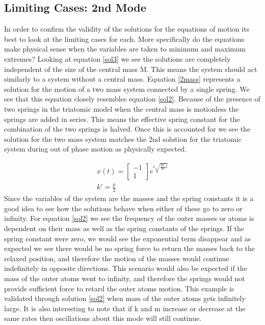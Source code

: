 \documentclass[hidelinks]{article}
\begin{document}
\begin{multicols}{2}
\section{Limiting Cases: 2nd Mode}
In order to confirm the validity of the solutions for the equations of motion its best to look at the limiting cases for each. More specifically do the equations make physical sense when the variables are taken to minimum and maximum extremes? Looking at equation \ref{sol3} we see the solutions are completely independent of the size of the central mass M. This means the system should act similarly to a system without a central mass. Equation \ref{2mass} represents a solution for the motion of a two mass system connected by a single spring. We see that this equation closely resembles equation \ref{sol2}. Because of the presence of two springs in the triatomic model when the central mass is motionless the springs are added in series. This means the effective spring constant for the combination of the two springs is halved. Once this is accounted for we see the solution for the two mass system matches the 2nd solution for the triatomic system during out of phase motion as physically expected.

\begin{equation}
\label{2mass}
\begin{split}
x(t)=
\begin{bmatrix}
-1\\
1
\end{bmatrix}
e^{i\sqrt{\frac{2k'}{m}t}}
\\
k'=\frac{k}{2}
\end{split}
\end{equation}
Since the variables of the system are the masses and the spring constants it is a good idea to see how the solutions behave when either of these go to zero or infinity. For equation \ref{sol2} we see the frequency of the outer masses or atoms is dependent on their mass as well as the spring constants of the springs. If the spring constant were zero, we would see the exponential term disappear and as expected we see there would be no spring force to return the masses back to the relaxed position, and therefore the motion of the masses would continue indefinitely in opposite directions. This scenario would also be expected if the mass of the outer atoms went to infinity, and therefore the springs would not provide sufficient force to retard the outer atoms motion. This example is validated through solution \ref{sol2} when mass of the outer atoms gets infinitely large. It is also interesting to note that if k and m increase or decrease at the same rates then oscillations about this mode will still continue.


\end{multicols}
\end{document}
